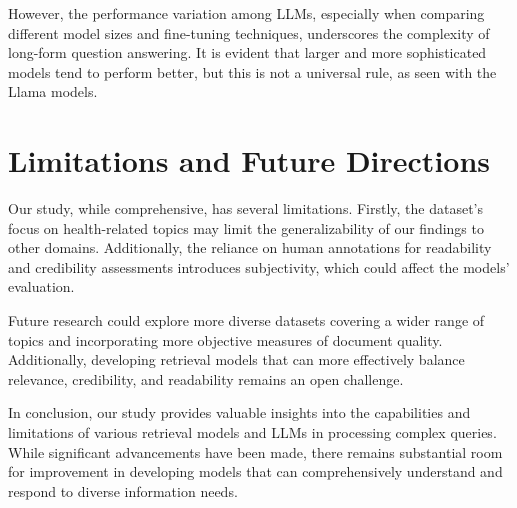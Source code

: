 However, the performance variation among LLMs, especially when comparing different model sizes and fine-tuning techniques, underscores the complexity of long-form question answering. It is evident that larger and more sophisticated models tend to perform better, but this is not a universal rule, as seen with the Llama models.

\section{Limitations and Future Directions}
Our study, while comprehensive, has several limitations. Firstly, the dataset's focus on health-related topics may limit the generalizability of our findings to other domains. Additionally, the reliance on human annotations for readability and credibility assessments introduces subjectivity, which could affect the models' evaluation.

Future research could explore more diverse datasets covering a wider range of topics and incorporating more objective measures of document quality. Additionally, developing retrieval models that can more effectively balance relevance, credibility, and readability remains an open challenge.

In conclusion, our study provides valuable insights into the capabilities and limitations of various retrieval models and LLMs in processing complex queries. While significant advancements have been made, there remains substantial room for improvement in developing models that can comprehensively understand and respond to diverse information needs.

